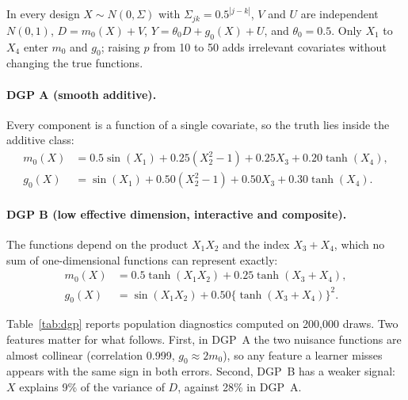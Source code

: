\documentclass[11pt,a4paper]{article}
\begin{document}
In every design $X\sim N(0,\Sigma)$ with $\Sigma_{jk}=0.5^{|j-k|}$, $V$ and $U$ are independent $N(0,1)$, $D=m_0(X)+V$, $Y=\theta_0D+g_0(X)+U$, and $\theta_0=0.5$. Only $X_1$ to $X_4$ enter $m_0$ and $g_0$; raising $p$ from 10 to 50 adds irrelevant covariates without changing the true functions.

\paragraph{DGP A (smooth additive).} Every component is a function of a single covariate, so the truth lies inside the additive class:
\begin{align}
m_0(X)&=0.5\sin(X_1)+0.25(X_2^2-1)+0.25X_3+0.20\tanh(X_4),\label{eq:mA}\\
g_0(X)&=\sin(X_1)+0.50(X_2^2-1)+0.50X_3+0.30\tanh(X_4).\label{eq:gA}
\end{align}

\paragraph{DGP B (low effective dimension, interactive and composite).} The functions depend on the product $X_1X_2$ and the index $X_3+X_4$, which no sum of one-dimensional functions can represent exactly:
\begin{align}
m_0(X)&=0.5\tanh(X_1X_2)+0.25\tanh(X_3+X_4),\label{eq:mB}\\
g_0(X)&=\sin(X_1X_2)+0.50\{\tanh(X_3+X_4)\}^2.\label{eq:gB}
\end{align}

Table~\ref{tab:dgp} reports population diagnostics computed on 200,000 draws. Two features matter for what follows. First, in DGP~A the two nuisance functions are almost collinear (correlation 0.999, $g_0\approx2m_0$), so any feature a learner misses appears with the same sign in both errors. Second, DGP~B has a weaker signal: $X$ explains 9\% of the variance of $D$, against 28\% in DGP~A.
\end{document}

